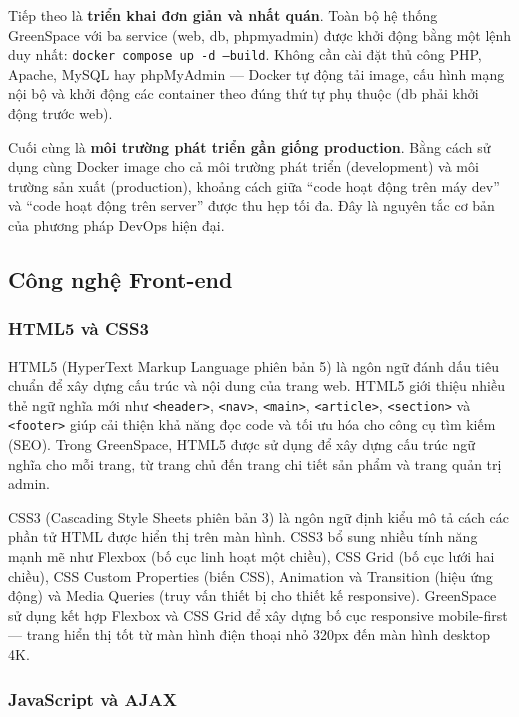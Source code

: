 \documentclass[11pt, a4paper]{article}
\begin{document}
Tiếp theo là \textbf{triển khai đơn giản và nhất quán}. Toàn bộ hệ thống GreenSpace với ba service (web, db, phpmyadmin) được khởi động bằng một lệnh duy nhất: \texttt{docker compose up -d --build}. Không cần cài đặt thủ công PHP, Apache, MySQL hay phpMyAdmin --- Docker tự động tải image, cấu hình mạng nội bộ và khởi động các container theo đúng thứ tự phụ thuộc (db phải khởi động trước web).

Cuối cùng là \textbf{môi trường phát triển gần giống production}. Bằng cách sử dụng cùng Docker image cho cả môi trường phát triển (development) và môi trường sản xuất (production), khoảng cách giữa ``code hoạt động trên máy dev'' và ``code hoạt động trên server'' được thu hẹp tối đa. Đây là nguyên tắc cơ bản của phương pháp DevOps hiện đại.

\subsection{Công nghệ Front-end}

\subsubsection{HTML5 và CSS3}

HTML5 (HyperText Markup Language phiên bản 5) là ngôn ngữ đánh dấu tiêu chuẩn để xây dựng cấu trúc và nội dung của trang web. HTML5 giới thiệu nhiều thẻ ngữ nghĩa mới như \texttt{<header>}, \texttt{<nav>}, \texttt{<main>}, \texttt{<article>}, \texttt{<section>} và \texttt{<footer>} giúp cải thiện khả năng đọc code và tối ưu hóa cho công cụ tìm kiếm (SEO). Trong GreenSpace, HTML5 được sử dụng để xây dựng cấu trúc ngữ nghĩa cho mỗi trang, từ trang chủ đến trang chi tiết sản phẩm và trang quản trị admin.

CSS3 (Cascading Style Sheets phiên bản 3) là ngôn ngữ định kiểu mô tả cách các phần tử HTML được hiển thị trên màn hình. CSS3 bổ sung nhiều tính năng mạnh mẽ như Flexbox (bố cục linh hoạt một chiều), CSS Grid (bố cục lưới hai chiều), CSS Custom Properties (biến CSS), Animation và Transition (hiệu ứng động) và Media Queries (truy vấn thiết bị cho thiết kế responsive). GreenSpace sử dụng kết hợp Flexbox và CSS Grid để xây dựng bố cục responsive mobile-first --- trang hiển thị tốt từ màn hình điện thoại nhỏ 320px đến màn hình desktop 4K.

\subsubsection{JavaScript và AJAX}
\end{document}
